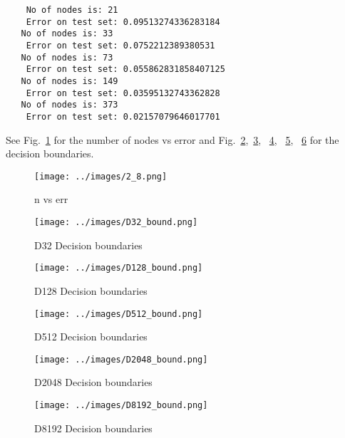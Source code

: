 \documentclass[a4paper]{article}
\theoremstyle{definition}
\newenvironment{soln}{
    \leavevmode\color{blue}\ignorespaces
}{}
\begin{document}
\begin{enumerate}
\begin{soln}
  \begin{verbatim}
    No of nodes is: 21 
    Error on test set: 0.09513274336283184
   No of nodes is: 33 
    Error on test set: 0.0752212389380531
   No of nodes is: 73 
    Error on test set: 0.055862831858407125
   No of nodes is: 149 
    Error on test set: 0.03595132743362828
   No of nodes is: 373 
    Error on test set: 0.02157079646017701
  \end{verbatim}

  See Fig.~\ref{fig:lc} for the number of nodes vs error and Fig.~\ref{fig:D32_bound},~\ref{fig:D128_bound}, ~\ref{fig:D512_bound}, ~\ref{fig:D2048_bound}, ~\ref{fig:D8192_bound} for the decision boundaries.

  \begin{figure}[H]
    \centering
    \texttt{[image: ../images/2\_8.png]}
    \caption{n vs err}
    \label{fig:lc}
  \end{figure}


  \begin{figure}[H]
    \centering
    \texttt{[image: ../images/D32\_bound.png]}
    \caption{D32 Decision boundaries}
    \label{fig:D32_bound}
  \end{figure}

  \begin{figure}[H]
    \centering
    \texttt{[image: ../images/D128\_bound.png]}
    \caption{D128 Decision boundaries}
    \label{fig:D128_bound}
  \end{figure}


  \begin{figure}[H]
    \centering
    \texttt{[image: ../images/D512\_bound.png]}
    \caption{D512 Decision boundaries}
    \label{fig:D512_bound}
  \end{figure}


  \begin{figure}[H]
    \centering
    \texttt{[image: ../images/D2048\_bound.png]}
    \caption{D2048 Decision boundaries}
    \label{fig:D2048_bound}
  \end{figure}


  \begin{figure}[H]
    \centering
    \texttt{[image: ../images/D8192\_bound.png]}
    \caption{D8192 Decision boundaries}
    \label{fig:D8192_bound}
  \end{figure}


\end{soln}
  
\end{enumerate}
\end{document}
